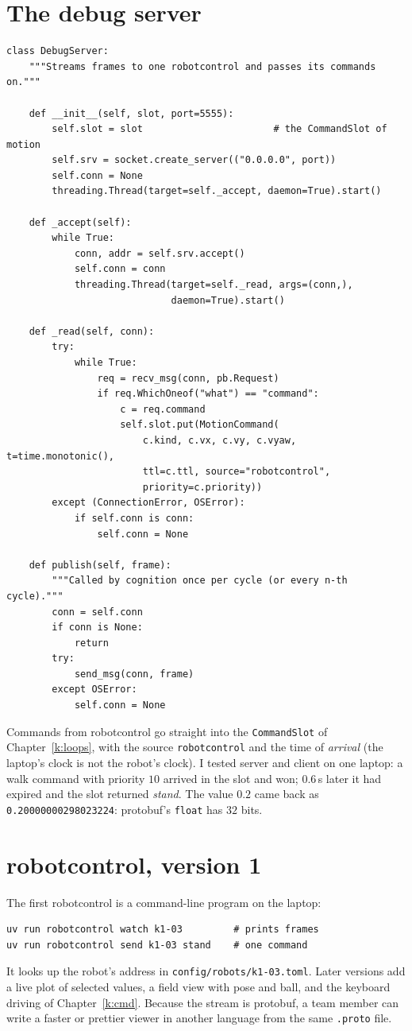 \section*{The debug server}
\begin{verbatim}
class DebugServer:
    """Streams frames to one robotcontrol and passes its commands on."""

    def __init__(self, slot, port=5555):
        self.slot = slot                       # the CommandSlot of motion
        self.srv = socket.create_server(("0.0.0.0", port))
        self.conn = None
        threading.Thread(target=self._accept, daemon=True).start()

    def _accept(self):
        while True:
            conn, addr = self.srv.accept()
            self.conn = conn
            threading.Thread(target=self._read, args=(conn,),
                             daemon=True).start()

    def _read(self, conn):
        try:
            while True:
                req = recv_msg(conn, pb.Request)
                if req.WhichOneof("what") == "command":
                    c = req.command
                    self.slot.put(MotionCommand(
                        c.kind, c.vx, c.vy, c.vyaw, t=time.monotonic(),
                        ttl=c.ttl, source="robotcontrol",
                        priority=c.priority))
        except (ConnectionError, OSError):
            if self.conn is conn:
                self.conn = None

    def publish(self, frame):
        """Called by cognition once per cycle (or every n-th cycle)."""
        conn = self.conn
        if conn is None:
            return
        try:
            send_msg(conn, frame)
        except OSError:
            self.conn = None
\end{verbatim}
Commands from robotcontrol go straight into the \texttt{CommandSlot} of Chapter~\ref{k:loops}, with the source \texttt{robotcontrol} and the time of \emph{arrival} (the laptop's clock is not the robot's clock). I tested server and client on one laptop: a walk command with priority $10$ arrived in the slot and won; $0.6$\,s later it had expired and the slot returned \emph{stand}. The value $0.2$ came back as \texttt{0.20000000298023224}: protobuf's \texttt{float} has $32$ bits.

\section*{robotcontrol, version 1}
The first robotcontrol is a command-line program on the laptop:
\begin{verbatim}
uv run robotcontrol watch k1-03         # prints frames
uv run robotcontrol send k1-03 stand    # one command
\end{verbatim}
It looks up the robot's address in \texttt{config/robots/k1-03.toml}. Later versions add a live plot of selected values, a field view with pose and ball, and the keyboard driving of Chapter~\ref{k:cmd}. Because the stream is protobuf, a team member can write a faster or prettier viewer in another language from the same \texttt{.proto} file.

